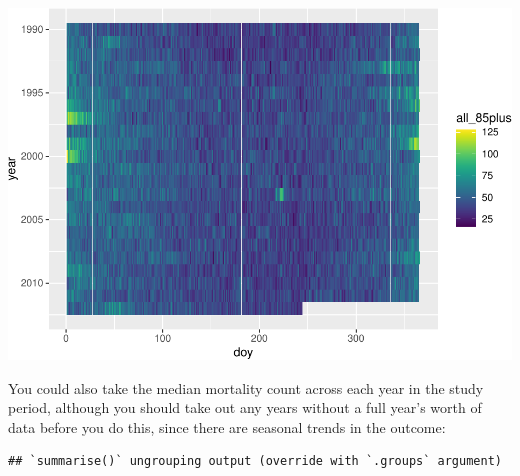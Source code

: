 \documentclass[
]{book}
\newenvironment{Shaded}{\begin{snugshade}}{\end{snugshade}}
\newcommand{\CommentTok}[1]{\textcolor[rgb]{0.56,0.35,0.01}{\textit{#1}}}
\newcommand{\DataTypeTok}[1]{\textcolor[rgb]{0.13,0.29,0.53}{#1}}
\newcommand{\DecValTok}[1]{\textcolor[rgb]{0.00,0.00,0.81}{#1}}
\newcommand{\KeywordTok}[1]{\textcolor[rgb]{0.13,0.29,0.53}{\textbf{#1}}}
\newcommand{\NormalTok}[1]{#1}
\newcommand{\OperatorTok}[1]{\textcolor[rgb]{0.81,0.36,0.00}{\textbf{#1}}}
\newcommand{\StringTok}[1]{\textcolor[rgb]{0.31,0.60,0.02}{#1}}
\begin{document}
\includegraphics{adv_epi_analysis_files/figure-latex/unnamed-chunk-13-1.pdf}

You could also take the median mortality count across each year in the
study period, although you should take out any years without a full year's
worth of data before you do this, since there are seasonal trends in the
outcome:

\begin{Shaded}
\end{Shaded}

\begin{verbatim}
## `summarise()` ungrouping output (override with `.groups` argument)
\end{verbatim}
\end{document}
